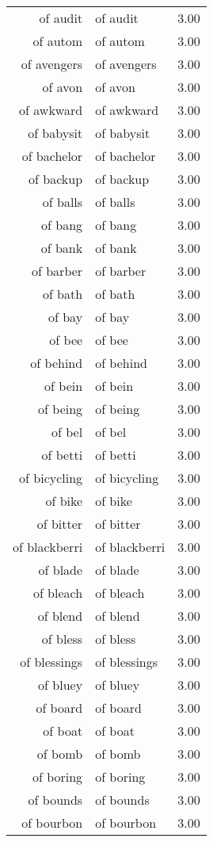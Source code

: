 \begin{table}[ht]
\begin{tabular}{rlr}
  of audit & of audit & 3.00 \\ 
  of autom & of autom & 3.00 \\ 
  of avengers & of avengers & 3.00 \\ 
  of avon & of avon & 3.00 \\ 
  of awkward & of awkward & 3.00 \\ 
  of babysit & of babysit & 3.00 \\ 
  of bachelor & of bachelor & 3.00 \\ 
  of backup & of backup & 3.00 \\ 
  of balls & of balls & 3.00 \\ 
  of bang & of bang & 3.00 \\ 
  of bank & of bank & 3.00 \\ 
  of barber & of barber & 3.00 \\ 
  of bath & of bath & 3.00 \\ 
  of bay & of bay & 3.00 \\ 
  of bee & of bee & 3.00 \\ 
  of behind & of behind & 3.00 \\ 
  of bein & of bein & 3.00 \\ 
  of being & of being & 3.00 \\ 
  of bel & of bel & 3.00 \\ 
  of betti & of betti & 3.00 \\ 
  of bicycling & of bicycling & 3.00 \\ 
  of bike & of bike & 3.00 \\ 
  of bitter & of bitter & 3.00 \\ 
  of blackberri & of blackberri & 3.00 \\ 
  of blade & of blade & 3.00 \\ 
  of bleach & of bleach & 3.00 \\ 
  of blend & of blend & 3.00 \\ 
  of bless & of bless & 3.00 \\ 
  of blessings & of blessings & 3.00 \\ 
  of bluey & of bluey & 3.00 \\ 
  of board & of board & 3.00 \\ 
  of boat & of boat & 3.00 \\ 
  of bomb & of bomb & 3.00 \\ 
  of boring & of boring & 3.00 \\ 
  of bounds & of bounds & 3.00 \\ 
  of bourbon & of bourbon & 3.00 \\ 

\end{tabular}
\end{table}
